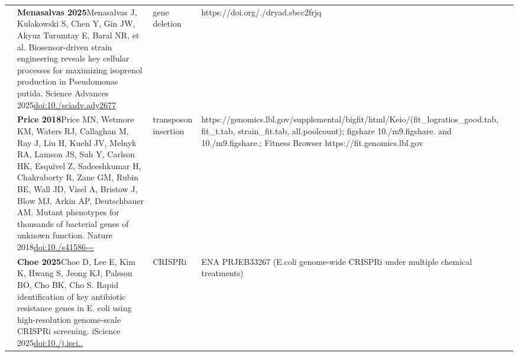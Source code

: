 \begin{landscape}
\begin{longtable}{@{}r@{\hspace{4pt}} L{86mm} L{74mm} L{78mm}@{}}
 & \textbf{Menasalvas 2025}\newline Menasalvas J, Kulakowski S, Chen Y, Gin JW, Akyuz Turumtay E, Baral NR, et al. Biosensor-driven strain engineering reveals key cellular processes for maximizing isoprenol production in Pseudomonas putida. Science Advances 2025\newline \href{https://doi.org/10.1126/sciadv.ady2677}{doi:10./\allowbreak sciadv.\allowbreak ady2677} & gene deletion & https:/\allowbreak /\allowbreak doi.\allowbreak org/./\allowbreak dryad.\allowbreak sbcc2frjq \\
 & \textbf{Price 2018}\newline Price MN, Wetmore KM, Waters RJ, Callaghan M, Ray J, Liu H, Kuehl JV, Melnyk RA, Lamson JS, Suh Y, Carlson HK, Esquivel Z, Sadeeshkumar H, Chakraborty R, Zane GM, Rubin BE, Wall JD, Visel A, Bristow J, Blow MJ, Arkin AP, Deutschbauer AM. Mutant phenotypes for thousands of bacterial genes of unknown function. Nature 2018\newline \href{https://doi.org/10.1038/s41586-018-0124-0}{doi:10./\allowbreak s41586---} & transposon insertion & https:/\allowbreak /\allowbreak genomics.\allowbreak lbl.\allowbreak gov/\allowbreak supplemental/\allowbreak bigfit/\allowbreak html/\allowbreak Keio/\allowbreak  (fit\_\allowbreak logratios\_\allowbreak good.\allowbreak tab, fit\_\allowbreak t.\allowbreak tab, strain\_\allowbreak fit.\allowbreak tab, all.\allowbreak poolcount); figshare 10./\allowbreak m9.\allowbreak figshare. and 10./\allowbreak m9.\allowbreak figshare.; Fitness Browser https:/\allowbreak /\allowbreak fit.\allowbreak genomics.\allowbreak lbl.\allowbreak gov \\
 & \textbf{Choe 2025}\newline Choe D, Lee E, Kim K, Hwang S, Jeong KJ, Palsson BO, Cho BK, Cho S. Rapid identification of key antibiotic resistance genes in E. coli using high-resolution genome-scale CRISPRi screening. iScience 2025\newline \href{https://doi.org/10.1016/j.isci.2025.112435}{doi:10./\allowbreak j.\allowbreak isci..} & CRISPRi & ENA PRJEB33267 (E.\allowbreak  coli genome-\allowbreak wide CRISPRi under multiple chemical treatments) \\

\end{longtable}
\end{landscape}
